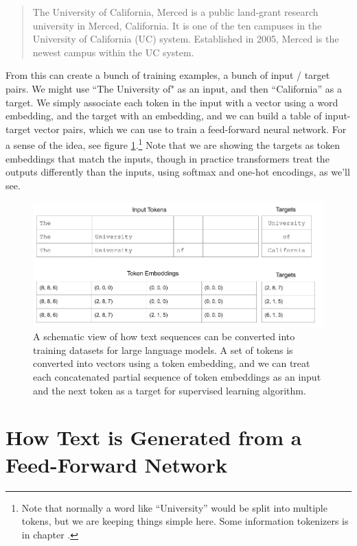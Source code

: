 \begin{quote}
The University of California, Merced is a public land-grant research university in Merced, California. It is one of the ten campuses in the University of California (UC) system. Established in 2005, Merced is the newest campus within the UC system.
\end{quote}

From this can create a bunch of training examples, a bunch of input / target pairs. We might use ``The University of" as an input, and then ``California'' as a target.  We simply associate each token in the input with a vector using a word embedding, and the target with an embedding, and we can build a table of input-target vector pairs, which we can use to train a feed-forward neural network.  For a sense of the idea, see figure \ref{nextWordPrediction}.\footnote{Note that normally a word like ``University'' would be split into multiple tokens, but we are keeping things simple here. Some information tokenizers is in chapter .}  Note that we are showing the targets as token embeddings that match the inputs, though in practice transformers treat the outputs differently than the inputs, using softmax and one-hot encodings, as we'll see.

\begin{figure}[h]
\centering
\includegraphics[scale=.45]{./images/nextWordPrediction.png}
\caption[Jeff Yoshimi]{A schematic view of how text sequences can be converted into training datasets for large language models. A set of tokens is converted into vectors using a token embedding, and we can treat each concatenated partial sequence of token embeddings as an input and the next token as a target for supervised learning algorithm. }
\label{nextWordPrediction}
\end{figure}
  
\section{How Text is Generated from a Feed-Forward Network}

